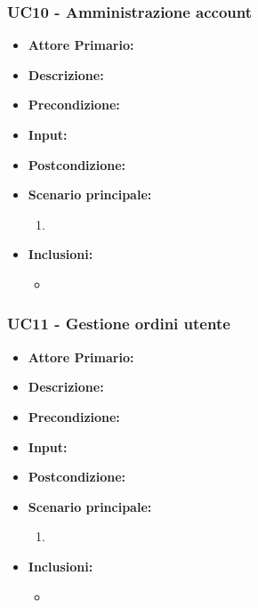 \subsubsection{UC10 - Amministrazione account}
\begin{itemize}
    \item \textbf{Attore Primario:} 
    \item \textbf{Descrizione:}
    \item \textbf{Precondizione:}
    \item \textbf{Input:}
    \item \textbf{Postcondizione:}
    \item \textbf{Scenario principale:}
    \begin{enumerate}
        \item 
    \end{enumerate}
    \item \textbf{Inclusioni:}
    \begin{itemize}
        \item
    \end{itemize}
\end{itemize}
\subsubsection{UC11 - Gestione ordini utente}
\begin{itemize}
    \item \textbf{Attore Primario:} 
    \item \textbf{Descrizione:}
    \item \textbf{Precondizione:}
    \item \textbf{Input:}
    \item \textbf{Postcondizione:}
    \item \textbf{Scenario principale:}
    \begin{enumerate}
        \item 
    \end{enumerate}
    \item \textbf{Inclusioni:}
    \begin{itemize}
        \item
    \end{itemize}
\end{itemize}
